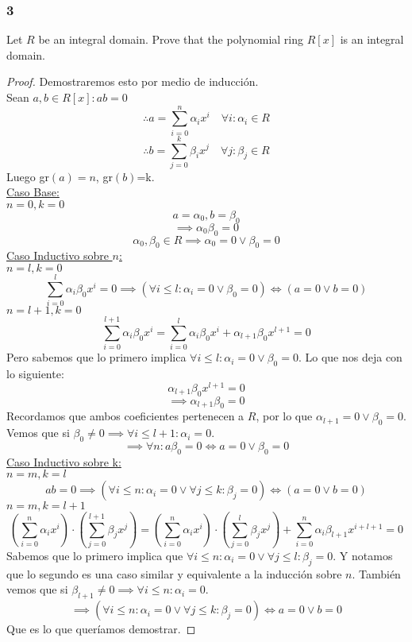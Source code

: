 \documentclass[11pt]{article}
\theoremstyle{definition}
\begin{document}
        \subsubsection{3}
        Let $R$ be an integral domain. Prove that the polynomial ring $R[x]$ is an integral domain.
        \begin{proof}
            Demostraremos esto por medio de inducción.\\
            Sean $a,b\in R[x]: ab=0$
            \[\therefore a=\sum^n_{i=0}\alpha_ix^i\quad \forall i:\alpha_i\in R\]
            \[\therefore b=\sum^k_{j=0}\beta_ix^j\quad \forall j:\beta_j\in R\]
            Luego gr$(a)=n$, gr$(b)$=k.\\
            \underline{Caso Base:}\\
            \underline{$n=0,k=0$}
            \[a=\alpha_0,b=\beta_0\]
            \[\implies \alpha_0\beta_0=0\]
            \[\alpha_0,\beta_0\in R\implies \alpha_0=0\vee\beta_0=0\]
            \underline{Caso Inductivo sobre $n$:}\\
            \underline{$n=l,k=0$}
            \[\sum^l_{i=0}\alpha_i\beta_0x^i=0\implies (\forall i\leq l: \alpha_i=0\vee \beta_0=0)\iff (a=0\vee b=0)\]
            \underline{$n=l+1,k=0$}
            \[\sum^{l+1}_{i=0}\alpha_i\beta_0x^i=\sum^l_{i=0}\alpha_i\beta_0x^i+\alpha_{l+1}\beta_0x^{l+1}=0\]
            Pero sabemos que lo primero implica $\forall i\leq l: \alpha_i=0\vee \beta_0=0$. Lo que nos deja con lo siguiente:
            \[\alpha_{l+1}\beta_0x^{l+1}=0\]
            \[\implies \alpha_{l+1}\beta_0=0\]
            Recordamos que ambos coeficientes pertenecen a $R$, por lo que $\alpha_{l+1}=0\vee \beta_0=0$. Vemos que si $\beta_0\neq0\implies \forall i\leq l+1:\alpha_i=0$.
            \[\implies \forall n: a\beta_0=0\iff a=0\vee \beta_0=0\]
            \underline{Caso Inductivo sobre k:}\\
            \underline{$n=m,k=l$}
            \[ab=0\implies(\forall i\leq n:\alpha_i=0\vee\forall j\leq k:\beta_j=0) \iff (a=0\vee b=0)\]
            \underline{$n=m,k=l+1$}
            \[\left(\sum^n_{i=0}\alpha_ix^i\right)\cdot\left(\sum^{l+1}_{j=0}\beta_jx^j\right)=\left(\sum^n_{i=0}\alpha_ix^i\right)\cdot\left(\sum^l_{j=0}\beta_jx^j\right)+\sum^n_{i=0}\alpha_i\beta_{l+1}x^{i+l+1}=0\]
            Sabemos que lo primero implica que $\forall i\leq n:\alpha_i=0\vee\forall j\leq l:\beta_j=0$. Y notamos que lo segundo es una caso similar y equivalente a la inducción sobre $n$. También vemos que si $\beta_{l+1}\neq 0\implies \forall i\leq n:\alpha_i=0$.
            \[\implies(\forall i\leq n:\alpha_i=0\vee\forall j\leq k:\beta_j=0)\iff a=0\vee b=0\]
            Que es lo que queríamos demostrar.
        \end{proof}
\end{document}
